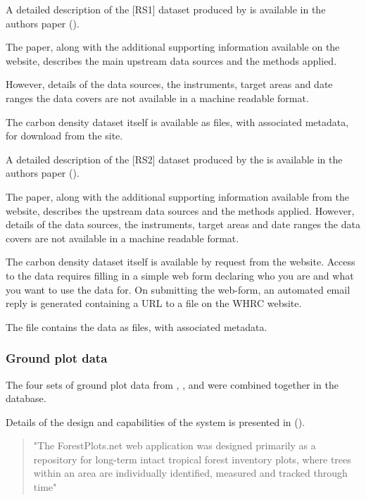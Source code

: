 \documentclass{article}
\begin{document}
A detailed description of the [RS1] dataset produced by 
is available in the authors paper (\cite{saatchi-2011}).

The paper, along with the additional supporting information available on the
\cite{pnas} website, describes the main upstream data sources and the methods applied.

However, details of the data sources, the instruments, target areas and date ranges
the data covers are not available in a machine readable format.

The carbon density dataset itself is available as \cite{format-geotiff} files,
with associated \cite{format-world} metadata, for download from the
\cite{nasa-jpl-carbon-ftp} site.

A detailed description of the [RS2] dataset produced by the 
is available in the authors paper (\cite{baccini-2012}).

The paper, along with the additional supporting information available from
the \cite{journal-nature} website,
describes the upstream data sources and the methods applied.
However, details of the data sources, the instruments, target areas and date ranges
the data covers are not available in a machine readable format.

The carbon density dataset itself is available by request from the 
\cite{whrc-data} website.
Access to the data requires filling in a simple web form declaring
who you are and what you want to use the data for.
On submitting the web-form, an automated email reply is generated
containing a URL to a \cite{format-zip}
file on the WHRC website.

The \cite{format-zip} file contains the data as \cite{format-geotiff}
files, with associated \cite{format-world} metadata.

\subsubsection{Ground plot data}

The four sets of ground plot data from
\cite{rainfor}, \cite{atdn}, \cite{team}
and \cite{ppbio}
were combined together in the 
\cite{forest-plots}
database.

Details of the design and capabilities of the \cite{forest-plots}
system is presented in  (\cite{gonzalez-2011}).

\begin{quote}
"The ForestPlots.net web application was designed primarily
as a repository for long-term intact tropical forest inventory
plots, where trees within an area are individually identified,
measured and tracked through time"
\end{quote}
\end{document}
